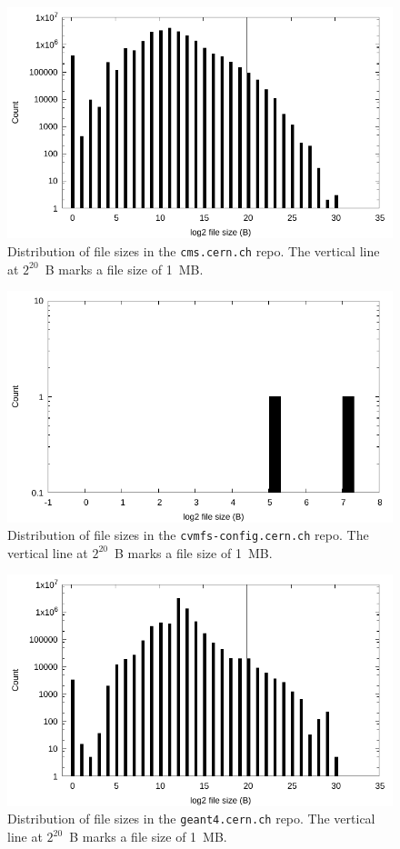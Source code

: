 \documentclass[conference]{IEEEtran}
\begin{document}
\begin{figure}
\includegraphics[width=\linewidth]{plots/file-hist/cms.pdf}
\caption{Distribution of file sizes in the \texttt{cms.cern.ch} repo.
The vertical line at $2^{20}$~B marks a file size of 1~MB.}
\end{figure}

\begin{figure}
\includegraphics[width=\linewidth]{plots/file-hist/cvmfs-config.pdf}
\caption{Distribution of file sizes in the \texttt{cvmfs-config.cern.ch} repo.
The vertical line at $2^{20}$~B marks a file size of 1~MB.}
\end{figure}

\begin{figure}
\includegraphics[width=\linewidth]{plots/file-hist/geant4.pdf}
\caption{Distribution of file sizes in the \texttt{geant4.cern.ch} repo.
The vertical line at $2^{20}$~B marks a file size of 1~MB.}
\end{figure}
\end{document}
